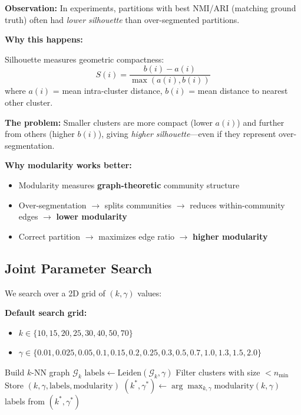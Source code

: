 \documentclass[11pt,a4paper]{article}
\newcommand{\set}[1]{\mathcal{#1}}
\begin{document}
\textbf{Observation:} In experiments, partitions with best NMI/ARI (matching ground truth) often had \textit{lower silhouette} than over-segmented partitions.

\textbf{Why this happens:}

Silhouette measures geometric compactness:
\begin{equation}
    S(i) = \frac{b(i) - a(i)}{\max(a(i), b(i))}
\end{equation}
where $a(i)$ = mean intra-cluster distance, $b(i)$ = mean distance to nearest other cluster.

\textbf{The problem:} Smaller clusters are more compact (lower $a(i)$) and further from others (higher $b(i)$), giving \textit{higher silhouette}---even if they represent over-segmentation.

\textbf{Why modularity works better:}
\begin{itemize}
    \item Modularity measures \textbf{graph-theoretic} community structure
    \item Over-segmentation $\rightarrow$ splits communities $\rightarrow$ reduces within-community edges $\rightarrow$ \textbf{lower modularity}
    \item Correct partition $\rightarrow$ maximizes edge ratio $\rightarrow$ \textbf{higher modularity}
\end{itemize}

\subsection{Joint Parameter Search}

We search over a 2D grid of $(k, \gamma)$ values:

\textbf{Default search grid:}
\begin{itemize}
    \item $k \in \{10, 15, 20, 25, 30, 40, 50, 70\}$
    \item $\gamma \in \{0.01, 0.025, 0.05, 0.1, 0.15, 0.2, 0.25, 0.3, 0.5, 0.7, 1.0, 1.3, 1.5, 2.0\}$
\end{itemize}

\begin{algorithm}[H]
\caption{Joint $k$-Resolution Sweep}
\begin{algorithmic}[1]
    \State Build $k$-NN graph $\set{G}_k$
        \State $\text{labels} \gets \text{Leiden}(\set{G}_k, \gamma)$
        \State Filter clusters with size $< n_{\min}$
            \State Store $(k, \gamma, \text{labels}, \text{modularity})$
        \EndIf
    \EndFor
\EndFor
\State $(k^*, \gamma^*) \gets \arg\max_{k,\gamma} \text{modularity}(k, \gamma)$
\State \Return labels from $(k^*, \gamma^*)$
\end{algorithmic}
\end{algorithm}
\end{document}
